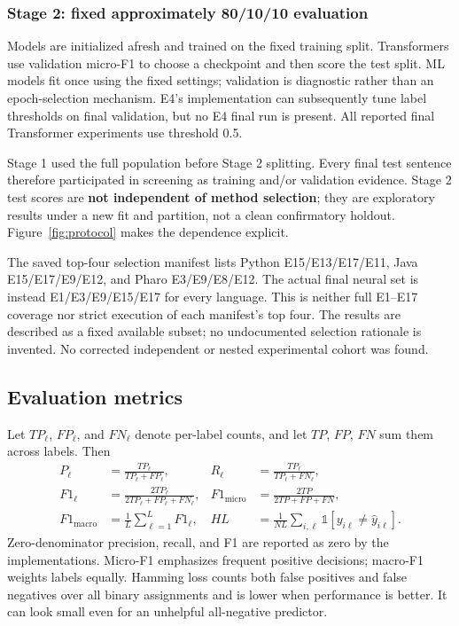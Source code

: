 \subsubsection{Stage 2: fixed approximately 80/10/10 evaluation}
Models are initialized afresh and trained on the fixed training split. Transformers use validation micro-F1 to choose a checkpoint and then score the test split. ML models fit once using the fixed settings; validation is diagnostic rather than an epoch-selection mechanism. E4's implementation can subsequently tune label thresholds on final validation, but no E4 final run is present. All reported final Transformer experiments use threshold 0.5.

Stage 1 used the full population before Stage 2 splitting. Every final test sentence therefore participated in screening as training and/or validation evidence. Stage 2 test scores are \textbf{not independent of method selection}; they are exploratory results under a new fit and partition, not a clean confirmatory holdout. Figure~\ref{fig:protocol} makes the dependence explicit.

The saved top-four selection manifest lists Python E15/E13/E17/E11, Java E15/E17/E9/E12, and Pharo E3/E9/E8/E12. The actual final neural set is instead E1/E3/E9/E15/E17 for every language. This is neither full E1--E17 coverage nor strict execution of each manifest's top four. The results are described as a fixed available subset; no undocumented selection rationale is invented. No corrected independent or nested experimental cohort was found.

\subsection{Evaluation metrics}
Let $TP_\ell$, $FP_\ell$, and $FN_\ell$ denote per-label counts, and let $TP$, $FP$, $FN$ sum them across labels. Then
\begin{align}
P_\ell&=\frac{TP_\ell}{TP_\ell+FP_\ell},&R_\ell&=\frac{TP_\ell}{TP_\ell+FN_\ell},\\
F1_\ell&=\frac{2TP_\ell}{2TP_\ell+FP_\ell+FN_\ell},&F1_{\mathrm{micro}}&=\frac{2TP}{2TP+FP+FN},\\
F1_{\mathrm{macro}}&=\frac1L\sum_{\ell=1}^L F1_\ell,&HL&=\frac1{NL}\sum_{i,\ell}\mathbb 1[y_{i\ell}\ne\widehat y_{i\ell}].
\end{align}
Zero-denominator precision, recall, and F1 are reported as zero by the implementations. Micro-F1 emphasizes frequent positive decisions; macro-F1 weights labels equally. Hamming loss counts both false positives and false negatives over all binary assignments and is lower when performance is better. It can look small even for an unhelpful all-negative predictor.

